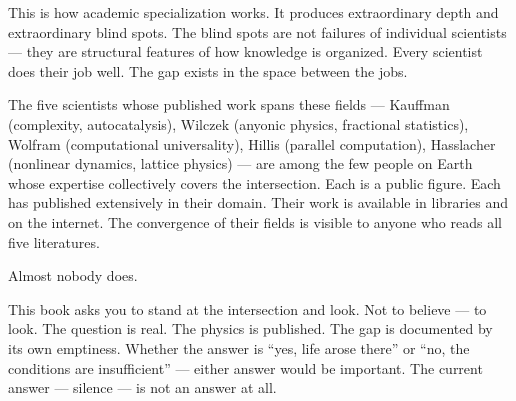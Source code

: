 This is how academic specialization works. It produces extraordinary depth and extraordinary blind spots. The blind spots are not failures of individual scientists --- they are structural features of how knowledge is organized. Every scientist does their job well. The gap exists in the space between the jobs.

The five scientists whose published work spans these fields --- Kauffman (complexity, autocatalysis), Wilczek (anyonic physics, fractional statistics), Wolfram (computational universality), Hillis (parallel computation), Hasslacher (nonlinear dynamics, lattice physics) --- are among the few people on Earth whose expertise collectively covers the intersection. Each is a public figure. Each has published extensively in their domain. Their work is available in libraries and on the internet. The convergence of their fields is visible to anyone who reads all five literatures.

Almost nobody does.

This book asks you to stand at the intersection and look. Not to believe --- to look. The question is real. The physics is published. The gap is documented by its own emptiness. Whether the answer is ``yes, life arose there'' or ``no, the conditions are insufficient'' --- either answer would be important. The current answer --- silence --- is not an answer at all.

\chapterreturn

